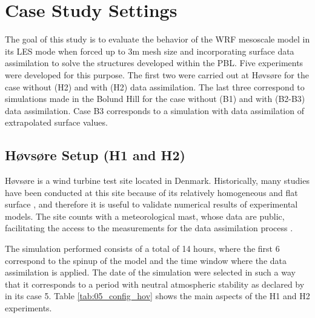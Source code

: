 \section{Case Study Settings}
The goal of this study is to evaluate the behavior of the WRF mesoscale model in its LES mode when forced up to 3m mesh size and incorporating surface data assimilation to solve the structures developed within the PBL. Five experiments were developed for this purpose. The first two were carried out at Høvsøre for the case without (H2) and with (H2) data assimilation. The last three correspond to simulations made in the Bolund Hill for the case without (B1) and with (B2-B3) data assimilation. Case B3 corresponds to a simulation with data assimilation of extrapolated surface values.


\subsection{Høvsøre Setup (H1 and H2)}
Høvsøre is a wind turbine test site located in Denmark. Historically, many studies have been conducted at this site because of its relatively homogeneous and flat surface \citep{Pea2015, Pea2013}, and therefore it is useful to validate numerical results of experimental models. The site counts with a meteorological mast, whose data are public, facilitating the access to the measurements for the data assimilation process \citep{floors2013wind}.

The simulation performed consists of a total of 14 hours, where the first 6 correspond to the spinup of the model and the time window where the data assimilation is applied. The date of the simulation were selected in such a way that it corresponds to a period with neutral atmospheric stability as declared by \cite{Pea2013} in its case 5. Table \ref{tab:05_config_hov} shows the main aspects of the H1 and H2 experiments.

